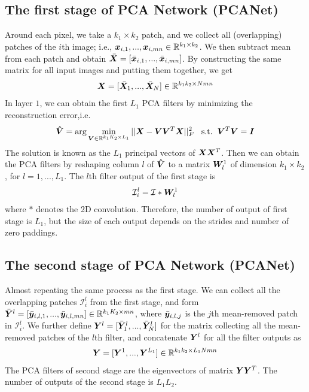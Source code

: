 \documentclass{article} %
\begin{document}
\subsection{The first stage of PCA Network (PCANet)}
Around each pixel, we take a $k_1 \times k_2$ patch, and we collect all (overlapping) patches of the $i$th image; i.e., $\boldsymbol{x}_{i,1},...,\boldsymbol{x}_{i,mn} \in \mathbb{R}^{k_1\times k_2}$. We then subtract mean from each patch and obtain $\bar{\boldsymbol{X}} = [\bar{\boldsymbol{x}}_{i,1},...,\bar{\boldsymbol{x}}_{i,mn}] $. By constructing the same matrix for all input images and putting them together, we get
\begin{eqnarray}
	\boldsymbol{X} = [\bar{\boldsymbol{X}}_1,...,\bar{\boldsymbol{X}}_N] \in \mathbb{R}^{k_1k_2\times Nmn}
\end{eqnarray}
In layer $1$, we can obtain the first $L_1$ PCA filters by minimizing the reconstruction error,i.e.
\begin{eqnarray}
	\boldsymbol{\hat{V}} = \arg\min_{\boldsymbol{V}\in \mathbb{R}^{k_1K_2\times L_1}} ||\boldsymbol{X}-\boldsymbol{VV}^T\boldsymbol{X}||^2_F  \hspace{0.3cm} \textrm{s.t.} \hspace{0.2cm} \boldsymbol{V}^T\boldsymbol{V} = \boldsymbol{I}
\end{eqnarray}
The solution is known as the $L_1$ principal vectors of $\boldsymbol{XX}^T$. Then we can obtain the PCA filters by reshaping column $l$ of $\boldsymbol{\hat{V}}$ to a matrix $\boldsymbol{W}_l^1$ of dimension $k_1\times k_2$, for $l=1,...,L_1$. The $l$th filter output of the first stage is
\begin{eqnarray}
	\mathcal{I}_i^l =  \mathcal{I} * \boldsymbol{W}_l^1
\end{eqnarray}
where $*$ denotes the 2D convolution. Therefore, the number of output of first stage is $L_1$, but the size of each output depends on the strides and number of zero paddings.



\subsection{The second stage of PCA Network (PCANet)}
Almost repeating the same process as the first stage. We can collect all the overlapping patches $\mathcal{I}_i^l$ from the first stage, and form $\bar{\boldsymbol{Y}}^l = [\bar{\boldsymbol{y}}_{i,l,1},...,\bar{\boldsymbol{y}}_{i,l,mn}]  \in \mathbb{R}^{k_1K_2\times mn}$, where $\bar{\boldsymbol{y}}_{i,l,j}$ is the $j$th mean-removed patch in $\mathcal{I}_i^l$. We further define $\boldsymbol{Y}^l = [\bar{\boldsymbol{Y}}_1^l,...,\bar{\boldsymbol{Y}}_N^l]$ for the matrix collecting all the mean-removed patches of the $l$th filter, and concatenate $\boldsymbol{Y}^l$ for all the filter outputs as 
\begin{eqnarray}
	\boldsymbol{Y} = [\boldsymbol{Y}^1,...,\boldsymbol{Y}^{L_1}] \in \mathbb{R}^{k_1k_2\times L_1Nmn}
\end{eqnarray} 
The PCA filters of second stage are the eigenvectors of matrix $\boldsymbol{YY}^T$. The number of outputs of the second stage is $L_1L_2$. 
\end{document}
